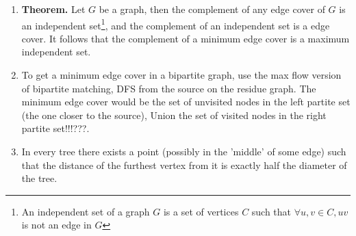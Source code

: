 \documentclass[12pt]{book}
\begin{document}
\begin{enumerate}[label = \roman*.]
\item
\textbf{Theorem. }Let $G$ be a graph, then the complement of any edge cover of $G$ is an independent set\footnote{An independent set of a graph $G$ is a set of vertices $C$ such that $\forall u, v \in C, uv$ is not an edge in $G$}, and the complement of an independent set is a edge cover. It follows that the complement of a minimum edge cover is a maximum independent set.

\item
To get a minimum edge cover in a bipartite graph, use the max flow version of bipartite matching, DFS from the source on the residue graph. The minimum edge cover would be the set of unvisited nodes in the left partite set (the one closer to the source), Union the set of visited nodes in the right partite set!!!???.

\item In every tree there exists a point (possibly in the 'middle' of some edge) such that the distance of the furthest vertex from it is exactly half the diameter of the tree.
\end{enumerate}
\end{document}
